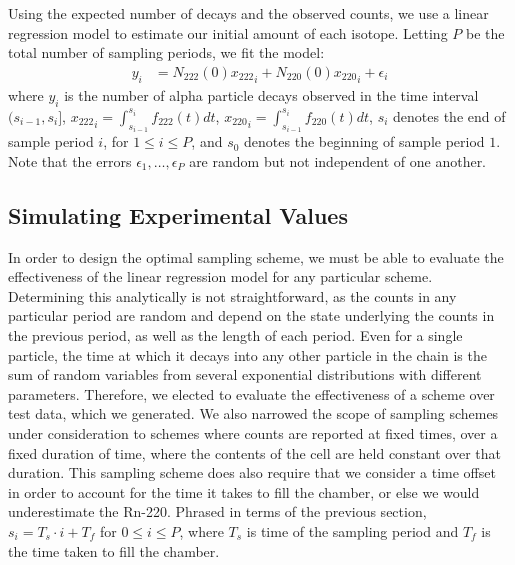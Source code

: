 \documentclass[11pt]{m2pi}
\begin{document}
Using the expected number of decays and the observed counts, we use a linear regression model to estimate our initial amount of each isotope. Letting $P$ be the total number of sampling periods, we fit the model:
    \begin{align*}
        y_i &= N_{222}(0) {x_{222}}_i + N_{220}(0) {x_{220}}_i + \epsilon_i
    \end{align*}
where $y_i$ is the number of alpha particle decays observed in the time interval $(s_{i-1}, s_i]$, ${x_{222}}_i = \int_{s_{i-1}}^{s_{i}}f_{222}(t)dt$, ${x_{220}}_i=\int_{s_{i-1}}^{s_i}f_{220}(t)dt$, $s_i$ denotes the end of sample period $i$, for $1\leq i \leq P$, and $s_0$ denotes the beginning of sample period $1$. Note that the errors $\epsilon_1,\ldots,\epsilon_P$ are random but not independent of one another.\\
\vspace*{-0.5cm}
\subsection{Simulating Experimental Values}\label{SS:SimulatingExperimentalValues}

In order to design the optimal sampling scheme, we must be able to evaluate the effectiveness of the linear regression model for any particular scheme. Determining this analytically is not straightforward, as the counts in any particular period are random and depend on the state underlying the counts in the previous period, as well as the length of each period. Even for a single particle, the time at which it decays into any other particle in the chain is the sum of random variables from several exponential distributions with different parameters. Therefore, we elected to evaluate the effectiveness of a scheme over test data, which we generated. We also narrowed the scope of sampling schemes under consideration to schemes where counts are reported at fixed times, over a fixed duration of time, where the contents of the cell are held constant over that duration. This sampling scheme does also require that we consider a time offset in order to account for the time it takes to fill the chamber, or else we would underestimate the Rn-220. Phrased in terms of the previous section, $s_i = T_s \cdot i + T_f$ for $0\leq i\leq P$, where $T_s$ is time of the sampling period and $T_f$ is the time taken to fill the chamber.\\
\end{document}
